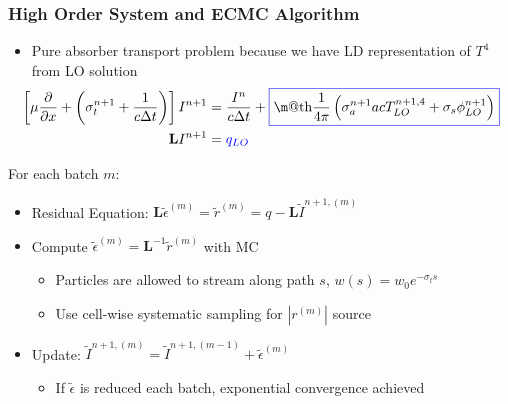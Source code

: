 \documentclass[xcolor=dvipsnames,hyperref={pdfpagelabels=false},unknownkeysallowed]{beamer}
\makeatletter
\newcommand*{\boxedcolor}{blue}
\renewcommand{\boxed}[1]{\textcolor{\boxedcolor}{%
  \fbox{\normalcolor\m@th$\displaystyle#1$}}}
\newcommand{\colb}[1]{{\color{blue} #1}}
\newlength{\wideitemsep}
\let\olditem\item
\renewcommand{\item}{\setlength{\itemsep}{\wideitemsep}\olditem}
\newcommand{\pderiv}[2]{\frac{\partial #1}{\partial #2}}
\newcommand{\B}[1]{\ensuremath{\mathbf{#1}}}
\makeatother
\begin{document}
\begin{frame}
    \frametitle{High Order System and ECMC Algorithm}
    \begin{itemize}
        \item \colb{Pure absorber} transport problem because we have LD
            representation of $T^4$ from LO solution
        \begin{align*}
            \hspace{-0.2in}
            \left[\mu \pderiv{}{x} + \left(\sigma_t^{n+1}+\frac{1}{c\Delta t}\right)\right]I^{n+1}
            &= \frac{I^{n}}{c\Delta t} + \boxed{\frac{1}{4\pi}\left(\sigma_a^{n+1} a c
    T_{LO}^{n+1,4}+\sigma_s\phi_{LO}^{n+1}\right)} \\
            \B L I^{n+1} &= \colb{q_{LO}}
     \end{align*}
        \vspace{-0.3in}
        \pause
        \end{itemize}
        \begin{block}{For each batch $m$:}
         \begin{itemize}
        \item Residual Equation: $\displaystyle \B L \tilde 
            \epsilon^{(m)} =
            \tilde r^{(m)} = q - \B L \tilde I^{n+1,(m)}$
        \item Compute $\tilde{\epsilon}^{(m)} = \B L^{-1} \tilde{r}^{(m)}$ with MC 
            \begin{itemize}
                \item Particles are allowed to stream along path $s$, $w(s)=w_0 e^{-\sigma_t s}$
                \item Use cell-wise {systematic} sampling for $|r^{(m)}|$ source
            \end{itemize}
        \item Update: $\tilde I^{n+1,(m)} = \tilde I^{n+1,(m-1)} + \tilde \epsilon^{(m)}$
        \begin{itemize}
            \item If $\tilde{\epsilon}$ is reduced each batch, \colb{exponential convergence
                achieved}
        \end{itemize}
    \end{itemize}
\end{block}
\end{frame}

\end{document}
